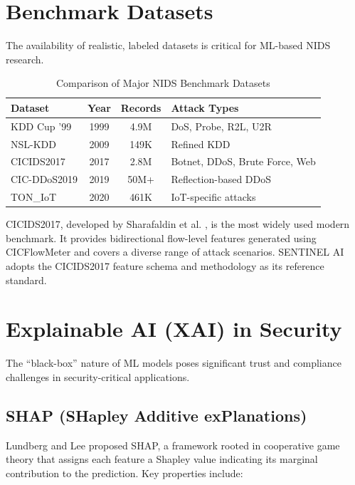 \section{Benchmark Datasets}

The availability of realistic, labeled datasets is critical for ML-based NIDS research.

\begin{table}[H]
\centering
\caption{Comparison of Major NIDS Benchmark Datasets}
\label{tab:datasets}
\begin{tabular}{l c c l}
\toprule
\textbf{Dataset} & \textbf{Year} & \textbf{Records} & \textbf{Attack Types} \\
\midrule
KDD Cup '99 & 1999 & 4.9M & DoS, Probe, R2L, U2R \\
NSL-KDD & 2009 & 149K & Refined KDD \\
CICIDS2017 & 2017 & 2.8M & Botnet, DDoS, Brute Force, Web \\
CIC-DDoS2019 & 2019 & 50M+ & Reflection-based DDoS \\
TON\_IoT & 2020 & 461K & IoT-specific attacks \\
\bottomrule
\end{tabular}
\end{table}

CICIDS2017, developed by Sharafaldin et al. \cite{sharafaldin2018toward}, is the most widely used modern benchmark. It provides bidirectional flow-level features generated using CICFlowMeter and covers a diverse range of attack scenarios. SENTINEL AI adopts the CICIDS2017 feature schema and methodology as its reference standard.

\section{Explainable AI (XAI) in Security}

The ``black-box'' nature of ML models poses significant trust and compliance challenges in security-critical applications.

\subsection{SHAP (SHapley Additive exPlanations)}

Lundberg and Lee \cite{lundberg2017unified} proposed SHAP, a framework rooted in cooperative game theory that assigns each feature a Shapley value indicating its marginal contribution to the prediction. Key properties include:

